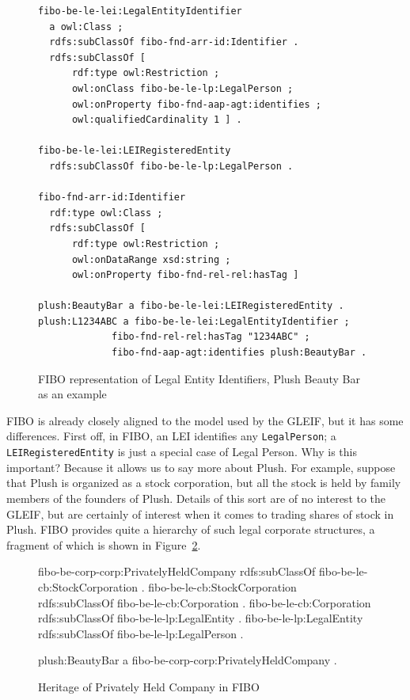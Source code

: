 \begin{figure}
\begin{lstlisting}
fibo-be-le-lei:LegalEntityIdentifier
  a owl:Class ;
  rdfs:subClassOf fibo-fnd-arr-id:Identifier .
  rdfs:subClassOf [
      rdf:type owl:Restriction ;
      owl:onClass fibo-be-le-lp:LegalPerson ;
      owl:onProperty fibo-fnd-aap-agt:identifies ;
      owl:qualifiedCardinality 1 ] .
   
fibo-be-le-lei:LEIRegisteredEntity
  rdfs:subClassOf fibo-be-le-lp:LegalPerson .   
  
fibo-fnd-arr-id:Identifier
  rdf:type owl:Class ;
  rdfs:subClassOf [
      rdf:type owl:Restriction ;
      owl:onDataRange xsd:string ;
      owl:onProperty fibo-fnd-rel-rel:hasTag ] 

plush:BeautyBar a fibo-be-le-lei:LEIRegisteredEntity .
plush:L1234ABC a fibo-be-le-lei:LegalEntityIdentifier ;
             fibo-fnd-rel-rel:hasTag "1234ABC" ;
             fibo-fnd-aap-agt:identifies plush:BeautyBar . 
\end{lstlisting}
    \caption{FIBO representation of Legal Entity Identifiers, Plush Beauty Bar as an example}
    \label{fig:ch14.fibolei}
\end{figure}

FIBO is already closely aligned to the model used by the 
GLEIF, but it has some differences.   First off, in FIBO, an LEI identifies 
any \texttt{LegalPerson}; a \texttt{LEIRegisteredEntity} is just a 
special case of Legal Person.  Why is this important?   Because it 
allows us to 
say more about Plush.  For example, suppose that Plush is organized 
as a stock corporation, but all the stock is held by family members of the 
founders of Plush.  Details of this sort are of no interest to 
the GLEIF, but are certainly of interest when it comes to trading shares of 
stock in Plush.  FIBO provides quite a hierarchy of such legal 
corporate structures, a fragment of which is shown in Figure~\ref{fig:ch14.fibocorp}.

\begin{figure}
fibo-be-corp-corp:PrivatelyHeldCompany
  rdfs:subClassOf fibo-be-le-cb:StockCorporation .
fibo-be-le-cb:StockCorporation
  rdfs:subClassOf fibo-be-le-cb:Corporation .
fibo-be-le-cb:Corporation
  rdfs:subClassOf fibo-be-le-lp:LegalEntity .
fibo-be-le-lp:LegalEntity
  rdfs:subClassOf fibo-be-le-lp:LegalPerson .
  
plush:BeautyBar a fibo-be-corp-corp:PrivatelyHeldCompany .

    \caption{Heritage of Privately Held Company in FIBO}
    \label{fig:ch14.fibocorp}
\end{figure}

